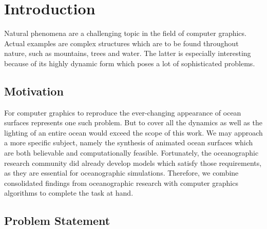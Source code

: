 \chapter{Introduction}
\label{ch:intro}
%
Natural phenomena are a challenging topic in the field of computer graphics.
Actual examples are complex structures which are to be found throughout nature,
such as mountains, trees and water. The latter is especially interesting
because of its highly dynamic form which poses a lot of sophisticated problems.
\section{Motivation}
\label{sec:motivation}
For computer graphics to reproduce the ever-changing appearance of ocean
surfaces represents one such problem. But to cover all the dynamics as well
as the lighting of an entire ocean would exceed the scope of this work.
We may approach a more specific subject, namely the synthesis of animated ocean
surfaces which are both believable and computationally feasible.
Fortunately, the oceanographic research community did already develop models
which satisfy those requirements, as they are essential for oceanographic
simulations. Therefore, we combine consolidated findings from oceanographic
research with computer graphics algorithms to complete the task at hand.




% 
% 
% 

\section{Problem Statement}
\label{sec:problem_statement}

